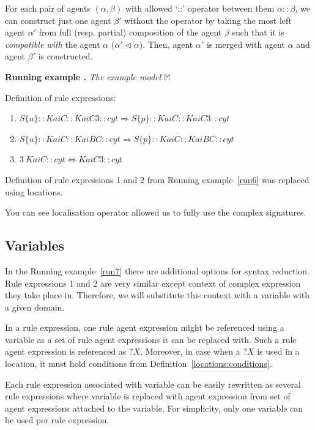 \documentclass[12pt, twoside]{fithesis2} %
\newcounter{counter}[section]
\renewcommand{\thecounter}{\thesection.\arabic{counter}}
\newenvironment{runningExample}[1]{\bigskip\refstepcounter{counter}\noindent\textbf{Running example \thecounter} \emph{#1} \par\nopagebreak}{\bigskip}
\begin{document}
For each pair of agents $(\alpha, \beta)$ with allowed `::' operator between them $\alpha :: \beta$, we can construct just one agent $\beta'$ without the operator by taking the most left agent $\alpha'$ from full (resp. partial) composition of the agent $\beta$ such that it is \emph{compatible with} the agent $\alpha$ ($\alpha' \lhd \alpha$). Then, agent $\alpha'$ is merged with agent $\alpha$ and agent $\beta'$ is constructed.

\begin{runningExample}{The example model $\mathds{M}$}
\label{run7}
\noindent Definition of rule expressions:
{\small
\begin{enumerate}
\item $S\{u\}::KaiC::KaiC3::cyt \Rightarrow S\{p\}::KaiC::KaiC3::cyt$
\item $S\{u\}::KaiC::KaiBC::cyt \Rightarrow S\{p\}::KaiC::KaiBC::cyt$
\item $3~KaiC::cyt \Leftrightarrow KaiC3::cyt$
\end{enumerate}
}
\end{runningExample}

\noindent Definition of rule expressions 1 and 2 from Running example~\ref{run6} was replaced using locations.

You can see localisation operator allowed us to fully use the complex signatures.

\subsection{Variables}

In the Running example~\ref{run7} there are additional options for syntax reduction. Rule expressions 1 and 2 are very similar except context of complex expression they take place in. Therefore, we will substitute this context with a variable with a given domain.

In a rule expression, one rule agent expression might be referenced using a variable as a set of rule agent expressions it can be replaced with. Such a rule agent expression is referenced as $?X$. Moreover, in case when a $?X$ is used in a location, it must hold conditions from Definition~\ref{locations:conditions}.

Each rule expression associated with variable can be easily rewritten as several rule expressions where variable is replaced with agent expression from set of agent expressions attached to the variable. For simplicity, only one variable can be used per rule expression.
\end{document}
